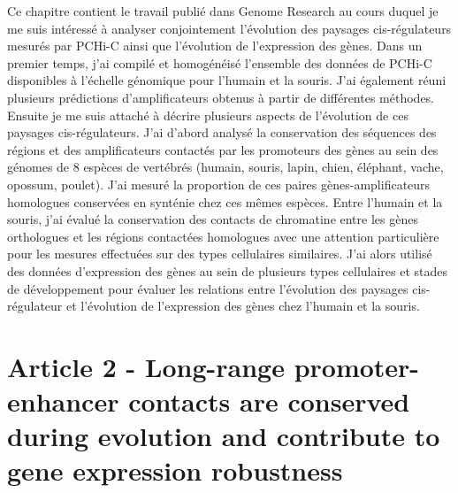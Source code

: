 Ce chapitre contient le travail publié dans Genome Research au cours duquel je me suis intéressé à analyser conjointement l’évolution des paysages cis-régulateurs mesurés par PCHi-C ainsi que l’évolution de l’expression des gènes. Dans un premier temps, j’ai compilé et homogénéisé l’ensemble des données de PCHi-C disponibles à l’échelle génomique pour l’humain et la souris. J’ai également réuni plusieurs prédictions d’amplificateurs obtenus à partir de différentes méthodes. Ensuite je me suis attaché à décrire plusieurs aspects de l’évolution de ces paysages cis-régulateurs. J’ai d’abord analysé la conservation des séquences des régions et des amplificateurs contactés par les promoteurs des gènes au sein des génomes de 8 espèces de vertébrés (humain, souris, lapin, chien, éléphant, vache, opossum, poulet). J’ai mesuré la proportion de ces paires gènes-amplificateurs homologues conservées en synténie chez ces mêmes espèces. Entre l’humain et la souris, j’ai évalué la conservation des contacts de chromatine entre les gènes orthologues et les régions contactées homologues avec une attention particulière pour les mesures effectuées sur des types cellulaires similaires. J’ai alors utilisé des données d’expression des gènes au sein de plusieurs types cellulaires et stades de développement pour évaluer les relations entre l’évolution des paysages cis-régulateur et l’évolution de l’expression des gènes chez l’humain et la souris.

\chapter{Article 2 - Long-range promoter-enhancer contacts are conserved during evolution and contribute to gene expression robustness}
\label{chap:chap3}
